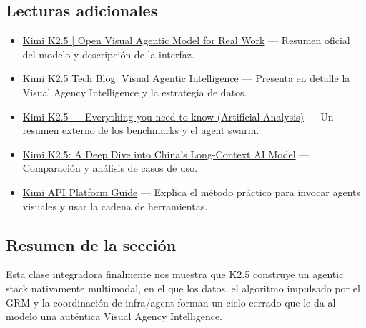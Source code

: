 \documentclass[a4paper]{article}
\begin{document}
\subsection{Lecturas adicionales}
\begin{itemize}
    \item \href{https://www.kimi.com/ai-models/kimi-k2-5/}{Kimi K2.5 | Open Visual Agentic Model for Real Work} — Resumen oficial del modelo y descripción de la interfaz.
    \item \href{https://www.kimi.com/blog/kimi-k2-5}{Kimi K2.5 Tech Blog: Visual Agentic Intelligence} — Presenta en detalle la Visual Agency Intelligence y la estrategia de datos.
    \item \href{https://artificialanalysis.ai/articles/kimi-k2-5-everything-you-need-to-know}{Kimi K2.5 — Everything you need to know (Artificial Analysis)} — Un resumen externo de los benchmarks y el agent swarm.
    \item \href{https://futuretechdiaries.com/article.php?slug=kimi-k2-5-a-deep-dive-into-chinas-long-context-ai-model}{Kimi K2.5: A Deep Dive into China’s Long-Context AI Model} — Comparación y análisis de casos de uso.
    \item \href{https://platform.kimi.ai/docs/guide}{Kimi API Platform Guide} — Explica el método práctico para invocar agents visuales y usar la cadena de herramientas.
\end{itemize}

\subsection{Resumen de la sección}
Esta clase integradora finalmente nos muestra que K2.5 construye un agentic stack nativamente multimodal, en el que los datos, el algoritmo impulsado por el GRM y la coordinación de infra/agent forman un ciclo cerrado que le da al modelo una auténtica Visual Agency Intelligence.
\end{document}
